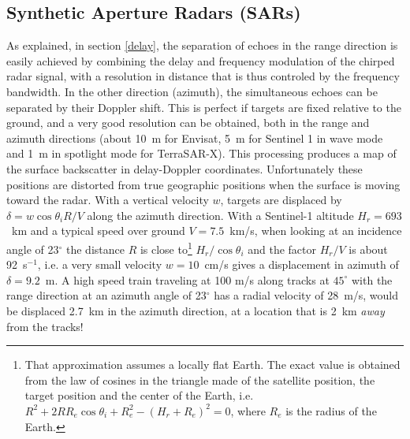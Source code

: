 


 \subsection{Synthetic Aperture Radars (SARs)}
As  explained, in section \ref{delay}, the separation of echoes in the range direction is easily achieved by combining the delay and frequency modulation of 
the chirped radar signal, with a resolution in distance that is thus controled by the frequency bandwidth. 
In the other direction (azimuth), the simultaneous echoes can be separated by their Doppler shift. 
This is perfect if targets are fixed relative to the ground, and a 
very good resolution can be obtained, both in the range and azimuth directions (about 10~m for Envisat, 5~m for Sentinel 1 in wave mode and 1~m in spotlight mode for TerraSAR-X). This processing 
produces a  map of the surface 
backscatter in delay-Doppler coordinates. Unfortunately these positions are distorted from  true geographic positions when the surface is moving toward the 
radar. With a vertical velocity $w$, targets are displaced by $\delta=w \cos \theta_i  R/V$ along the azimuth direction. With a Sentinel-1 altitude $H_r = 693$~km  and a typical speed over ground $V=7.5$~km/s, when looking at an incidence angle of 23$^\circ$ the distance $R$ is close to\footnote{That approximation assumes a locally flat Earth. The exact value is obtained from the law of cosines in the triangle made of the satellite position, the target position and the center of the Earth, i.e. $R^2 + 2 R R_e \cos \theta_i +R_e^2 - (H_r +R_e)^2=0$, where $R_e$ is the radius of the Earth.} $H_r/\cos \theta_i$ and the 
factor $H_r/V$ is about 92~s$^{-1}$, i.e. a very small velocity  $w= 10$~cm/s gives a displacement in azimuth of $\delta=9.2$~m. 
A high speed train traveling at 100 m/s along tracks at $45^\circ$ with the range direction at an azimuth angle of 23$^\circ$ has a radial velocity of 28~m/s, would be displaced 2.7~km in the azimuth direction, at a location that is 2~km \textit{away} from the tracks!
%
%


